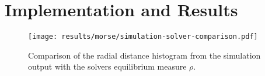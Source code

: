\chapter{Implementation and Results}
\label{chap:implementation-and-results}



\begin{figure}[H]
  \centering
  \label{fig:simulation-solver-comparison}
  \texttt{[image: results/morse/simulation-solver-comparison.pdf]}
  \caption[]{Comparison of the radial distance histogram from the simulation output with the solvers equilibrium measure $\rho$.}
\end{figure}
